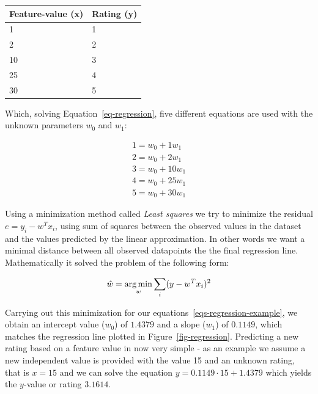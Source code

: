 \begin{table}[H]
  \centering
  \begin{tabular}{ll}
  \toprule
  Feature-value (x) & Rating (y) \\
  \midrule
   1 & 1 \\
   2  & 2 \\
   10  & 3 \\
   25 & 4 \\
   30  & 5 \\
   \bottomrule
  \end{tabular}
\end{table}

Which, solving Equation~\ref{eq-regression}, five different equations are
used with the unknown parameters $w_0$ and $w_1$:

\begin{equation}
  \label{eqs-regression-example}
  \begin{split}
    1 = w_0 + 1 w_1 \\
    2 = w_0 + 2 w_1 \\
    3 = w_0 + 10 w_1 \\
    4 = w_0 + 25 w_1 \\
    5 = w_0 + 30 w_1
  \end{split}
\end{equation}

Using a minimization method called \textit{Least squares} we try to minimize
the residual $e = y_i - w^{T}x_{i}$, using sum of squares between the observed
values in the dataset and the values predicted by the linear approximation. In
other words we want a minimal distance between all observed datapoints the the
final regression line. Mathematically it solved the problem of the following
form:

\begin{equation}
  \hat{w} = \operatorname*{arg\,min}_w \sum_{i} (y - w^{T}x_{i})^2
\end{equation}

Carrying out this minimization for our equations~\ref{eqs-regression-example},
we obtain an intercept value ($w_0$) of $1.4379$ and a slope ($w_1$) of
$0.1149$, which matches the regression line plotted in
Figure~\ref{fig-regression}. Predicting a new rating based on a feature value
in now very simple - as an example we assume a new independent value is
provided with the value 15 and an unknown rating, that is $x=15$ and we can
solve the equation $y = 0.1149 \cdot 15 + 1.4379$ which yields the $y$-value or
rating $3.1614$.

